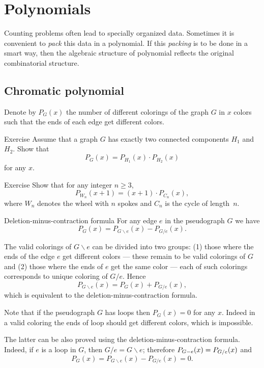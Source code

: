 \chapter{Polynomials}

Counting problems often lead to specially organized data.
Sometimes it is convenient to {}\emph{pack} this data in a polynomial.
If this {}\emph{packing} is to be done in a smart way, then the algebraic structure of polynomial reflects the original combinatorial structure.

\section*{Chromatic polynomial}

Denote by $P_G(x)$ the number of different colorings of the graph $G$ in $x$ colors such that the ends of each edge get different colors.

\begin{thm}{Exercise}
Assume that a graph $G$ has exactly two connected components $H_1$ and $H_2$.
Show that 
\[P_G(x)=P_{H_1}(x)\cdot P_{H_2}(x)\]
for any $x$.
\end{thm}

\begin{thm}{Exercise}
Show that for any integer $n\ge 3$,
\[P_{W_n}(x+1)=(x+1)\cdot P_{C_n}(x),\]
where $W_n$ denotes the wheel with $n$ spokes and $C_n$ is the cycle of length~$n$.
\end{thm}

\begin{thm}{Deletion-minus-contraction formula}\label{thm:deletion-minus-contraction}
For any edge $e$ in the pseudograph $G$ we have
\[P_G(x)=P_{G\backslash e}(x)-P_{G/e}(x).\]
\end{thm}

The valid colorings of $G\backslash e$ can be divided into two groups: 
(1) those where the ends of the edge $e$ get different colors --- these remain to be valid colorings of $G$ and (2) those where the ends of $e$ get the same color --- each of such colorings corresponds to unique coloring of $G/e$.
Hence
\[P_{G\backslash e}(x)=P_G(x)+P_{G/e}(x),\]
which is equivalent to the deletion-minus-contraction formula.
\qeds

Note that if the pseudograph $G$ has loops then $P_G(x)=0$ for any $x$.
Indeed in a valid coloring the ends of loop should get different colors, which is impossible.

The latter can be also proved using the deletion-minus-contraction formula.
Indeed, if $e$ is a loop in $G$, then $G/e=G\backslash e$;
therefore $P_{G\backslash e}(x)\z=P_{G/e}(x)$ and
\[P_G(x)=P_{G\backslash e}(x)-P_{G/e}(x) =0.\]

